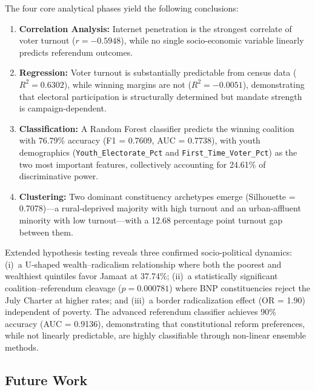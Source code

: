 \documentclass[12pt, a4paper]{article}
\begin{document}
The four core analytical phases yield the following conclusions:

\begin{enumerate}
    \item \textbf{Correlation Analysis:} Internet penetration is the strongest correlate of voter turnout ($r = -0.5948$), while no single socio-economic variable linearly predicts referendum outcomes.

    \item \textbf{Regression:} Voter turnout is substantially predictable from census data ($R^2 = 0.6302$), while winning margins are not ($R^2 = -0.0051$), demonstrating that electoral participation is structurally determined but mandate strength is campaign-dependent.

    \item \textbf{Classification:} A Random Forest classifier predicts the winning coalition with 76.79\% accuracy (F1 = 0.7609, AUC = 0.7738), with youth demographics (\texttt{Youth\_Electorate\_Pct} and \texttt{First\_Time\_Voter\_Pct}) as the two most important features, collectively accounting for 24.61\% of discriminative power.

    \item \textbf{Clustering:} Two dominant constituency archetypes emerge (Silhouette = 0.7078)---a rural-deprived majority with high turnout and an urban-affluent minority with low turnout---with a 12.68 percentage point turnout gap between them.
\end{enumerate}

Extended hypothesis testing reveals three confirmed socio-political dynamics: (i)~a U-shaped wealth--radicalism relationship where both the poorest and wealthiest quintiles favor Jamaat at 37.74\%; (ii)~a statistically significant coalition--referendum cleavage ($p = 0.000781$) where BNP constituencies reject the July Charter at higher rates; and (iii)~a border radicalization effect (OR = 1.90) independent of poverty. The advanced referendum classifier achieves 90\% accuracy (AUC = 0.9136), demonstrating that constitutional reform preferences, while not linearly predictable, are highly classifiable through non-linear ensemble methods.

\subsection{Future Work}
\end{document}

